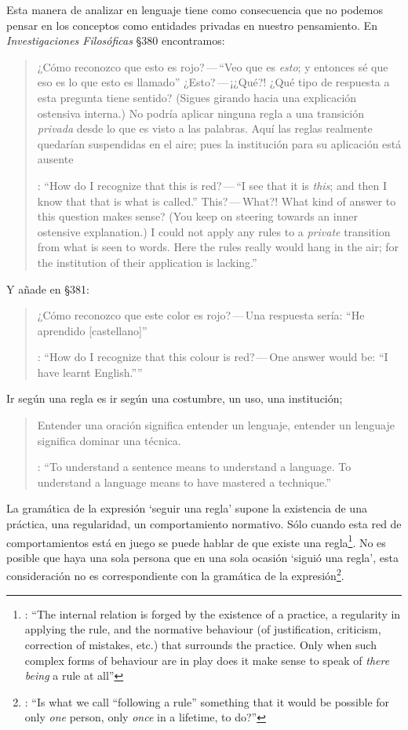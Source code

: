 Esta manera de analizar en lenguaje tiene como consecuencia que no podemos pensar en los conceptos como entidades privadas en nuestro pensamiento. En \emph{Investigaciones Filosóficas} \S380 encontramos: \blockquote[{\cite[\S380]{wittgenstein1953phiinv}}: \enquote{How do I recognize that this is red?\,---\,``I see that it is \emph{this}; and then I know that that is what is called.'' This?\,---\,What?! What kind of answer to this question makes sense? (You keep on steering towards an inner ostensive explanation.) I could not apply any rules to a \emph{private} transition from what is seen to words. Here the rules really would hang in the air; for the institution of their application is lacking.}]{¿Cómo reconozco que esto es rojo?\,---\,``Veo que es \emph{esto}; y entonces sé que eso es lo que esto es llamado'' ¿Esto?\,---\,¡¿Qué?! ¿Qué tipo de respuesta a esta pregunta tiene sentido? (Sigues girando hacia una explicación ostensiva interna.) No podría aplicar ninguna regla a una transición \emph{privada} desde lo que es visto a las palabras. Aquí las reglas realmente quedarían suspendidas en el aire; pues la institución para su aplicación está ausente}.

Y añade en \S381: \blockquote[{\cite[\S380]{wittgenstein1953phiinv}}: \enquote{How do I recognize that this colour is red?\,---\,One answer would be: ``I have learnt English.''}]{¿Cómo reconozco que este color es rojo?\,---\,Una respuesta sería: ``He aprendido [castellano]''}. Ir según una regla es ir según una costumbre, un uso, una institución; \blockquote[{\cite[\S199]{wittgenstein1953phiinv}}: \enquote{To understand a sentence means to understand a language. To understand a language means to have mastered a technique.}]{Entender una oración significa entender un lenguaje, entender un lenguaje significa dominar una técnica.} La gramática de la expresión `seguir una regla' supone la existencia de una práctica, una regularidad, un comportamiento normativo. Sólo cuando esta red de comportamientos está en juego se puede hablar de que existe una regla\footnote{\cite[Cf.~][p.~14]{bakerhacker2009understanding}: \enquote{The internal relation is forged by the existence of a practice, a regularity in applying the rule, and the normative behaviour (of justification, criticism, correction of mistakes, etc.) that surrounds the practice. Only when such complex forms of behaviour are in play does it make sense to speak of \emph{there being} a rule at all}}. No es posible que haya una sola persona que en una sola ocasión `siguió una regla', esta consideración no es correspondiente con la gramática de la expresión\footnote{\cite[Cf.~][\S199]{wittgenstein1953phiinv}: \enquote{Is what we call ``following a rule'' something that it would be possible for only \emph{one} person, only \emph{once} in a lifetime, to do?}}.

